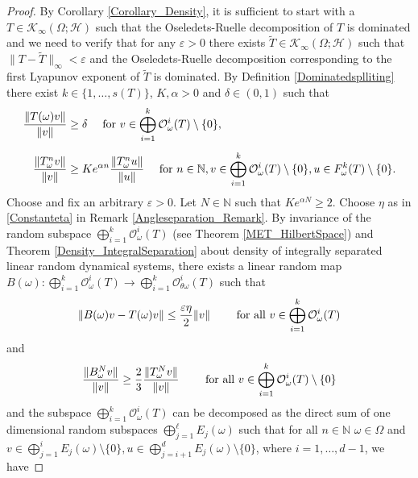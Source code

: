 \documentclass[pdflatex,sn-mathphys-num]{sn-jnl}%
\theoremstyle{thmstyleone}%
\theoremstyle{thmstyletwo}%
\theoremstyle{thmstylethree}%
\newcommand{\N}{\mathbb{N}}
\newcommand{\cK}{\mathcal{K}}
\newcommand{\cO}{\mathcal{O}}
\newcommand{\eps}{\varepsilon}
\numberwithin{equation}{section}
\begin{document}
\begin{proof}
By Corollary  \ref{Corollary_Density}, it is sufficient to start with a $T\in \cK_{\infty}(\Omega;\mathcal H)$ such that the Oseledets-Ruelle decomposition of $T$ is dominated and we need to verify that for any $\eps>0$ there exists $\widetilde T\in \cK_{\infty}(\Omega;\mathcal H)$ such that $\|T-\widetilde T\|_{\infty}<\eps$ and the Oseledets-Ruelle decomposition corresponding to the first Lyapunov exponent of $\widetilde T$ is dominated. By Definition \ref{Dominatedsplliting} there exist $k\in\{1,\dots,s(T)\}$, $K,\alpha>0$ and $\delta\in (0,1)$ such that 
\begin{align}
\frac{\|T(\omega)v\|}{\|v\|}& \geq \delta 
\quad \hbox{ for } v\in \bigoplus_{i=1}^{k} \mathcal O^i_{\omega}(T)\setminus\{0\},\label{Angleseparation_Eq1}\\[1ex]
\frac{\|T_{\omega}^n v\|}{\|v\|}
& \geq K e^{\alpha n}
    \frac{\|T_{\omega}^n u\|}{\|u\|}
\quad \hbox{ for } n\in\N, v\in \bigoplus_{i=1}^{k} \mathcal O^i_{\omega}(T)\setminus\{0\}, u\in F^{k}_{\omega}(T)\setminus\{0\}.\label{Speedseparation}
\end{align}
Choose and fix an arbitrary $\eps>0$. Let $N\in\N$ such that $Ke^{\alpha N}\geq 2$. Choose $\eta$ as in \eqref{Constanteta} in Remark \ref{Angleseparation_Remark}. By invariance of the random subspace $\bigoplus_{i=1}^k \cO^i_{\omega}(T)$ (see Theorem \ref{MET_HilbertSpace}) and Theorem \ref{Density_IntegralSeparation} about density of integrally separated linear random dynamical systems, there exists a linear random map $B(\omega): \bigoplus_{i=1}^k \cO^i_{\omega}(T)\rightarrow \bigoplus_{i=1}^k \cO^i_{\theta \omega}(T)$ such that 
\begin{equation}\label{Estimate_Restriction}
\|B(\omega)v-T(\omega)v\|
\leq \frac{\eps \eta}{2}\|v\| \qquad \hbox{ for all } v\in \bigoplus_{i=1}^k \cO^i_{\omega}(T)
\end{equation}
and 
\begin{equation}\label{Estimate_Restriction_II}
\frac{\|B^N_{\omega}v\|}{\|v\|}
\geq \frac{2}{3}\frac{\|T^N_{\omega}v\|}{\|v\|} \qquad \hbox{ for all } v\in \bigoplus_{i=1}^k \cO^i_{\omega}(T) \setminus\{0\}
\end{equation}
and the subspace $\bigoplus_{i=1}^k \cO^i_{\omega}(T)$ can be decomposed as the direct sum of one dimensional random subspaces $\bigoplus_{j=1}^{\ell} E_j(\omega)$ such that for all $n\in\N$ $\omega\in \Omega$ and $v\in \bigoplus_{j=1}^i E_j(\omega)\setminus\{0\}, u\in \bigoplus_{j=i+1}^dE_{j}(\omega)\setminus\{0\}$, where $i=1,\dots,d-1$, we have 

\end{proof}
\end{document}
